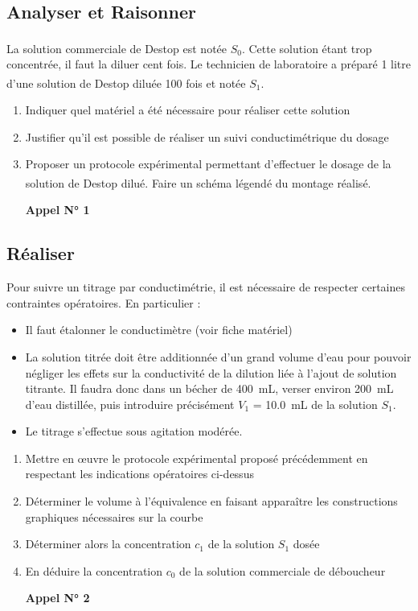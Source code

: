 \documentclass[a4paper,11pt,fleqn]{article}%
\begin{document}
\subsection{Analyser et Raisonner}
La solution commerciale de Destop\textsuperscript{\textregistered} est notée $S_0$. Cette solution étant trop concentrée, il faut la diluer cent fois. Le technicien de laboratoire a préparé 1 litre d'une solution de Destop\textsuperscript{\textregistered} diluée 100 fois et notée $S_1$.
\begin{enumerate}
	\item Indiquer quel matériel a été nécessaire pour réaliser cette solution
	\item Justifier qu'il est possible de réaliser un suivi conductimétrique du dosage
	\item Proposer un protocole expérimental permettant d'effectuer le dosage de la solution de Destop\textsuperscript{\textregistered} dilué. Faire un schéma légendé du montage réalisé.\\
	\begin{center}	\textbf{Appel N° 1} \end{center}
\end{enumerate}

\subsection{Réaliser}
Pour suivre un titrage par conductimétrie, il est nécessaire de respecter certaines contraintes opératoires. En particulier :
\begin{itemize}
	\item Il faut étalonner le conductimètre (voir fiche matériel)
	\item La solution titrée doit être additionnée d'un grand volume d'eau pour pouvoir négliger les effets sur  la conductivité de la dilution liée à l'ajout de solution titrante. Il faudra donc dans un bécher de \SI{400}{mL}, verser environ \SI{200}{mL} d'eau distillée, puis introduire précisément $V_1$ = \SI{10,0}{mL} de la solution $S_1$.
	\item Le titrage s'effectue sous agitation modérée.
\end{itemize}
\begin{enumerate}[resume]
	\item Mettre en œuvre le protocole expérimental proposé précédemment en respectant les indications opératoires ci-dessus
	\item Déterminer le volume à l'équivalence en faisant apparaître les constructions graphiques nécessaires sur la courbe
	\item Déterminer alors la concentration $c_1$ de la solution $S_1$ dosée
	\item En déduire la concentration $c_0$ de la solution commerciale de déboucheur
	\begin{center}	\textbf{Appel N° 2} \end{center}
\end{enumerate}
\end{document}
